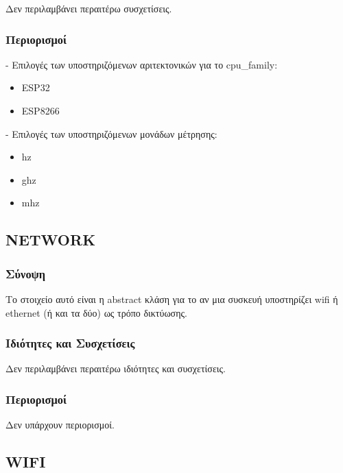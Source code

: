 \noindent Δεν περιλαμβάνει περαιτέρω συσχετίσεις.

\subsubsection*{Περιορισμοί}

\noindent - Επιλογές των υποστηριζόμενων αριτεκτονικών για το cpu\_family:

\begin{itemize}
	\item ESP32
	\item ESP8266
\end{itemize}

\noindent - Επιλογές των υποστηριζόμενων μονάδων μέτρησης:

\begin{itemize}
	\item hz
	\item ghz
	\item mhz
\end{itemize}

\subsection{NETWORK}
\label{subsec:network}

\subsubsection*{Σύνοψη}

\noindent Το στοιχείο αυτό είναι η abstract κλάση για το αν μια συσκευή υποστηρίζει wifi ή ethernet (ή και τα δύο) ως τρόπο δικτύωσης.

\subsubsection*{Ιδιότητες και Συσχετίσεις}

\noindent Δεν περιλαμβάνει περαιτέρω ιδιότητες και συσχετίσεις.

\subsubsection*{Περιορισμοί}

\noindent Δεν υπάρχουν περιορισμοί.

\subsection{WIFI}
\label{subsec:wifi}

